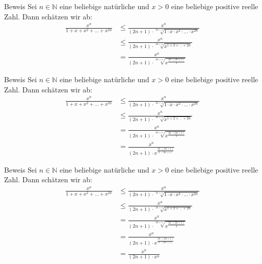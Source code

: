 \documentclass[10pt]{beamer}
\def\bN{\mathbb{N}}
\begin{document}
\begin{frame}{Beweis}
    Sei \( n \in \bN \) eine beliebige natürliche und \( x > 0 \) eine beliebige positive reelle Zahl. Dann schätzen wir ab:
    \begin{align*}
        \frac{x^{n}}{1 + x + x^{2} + \ldots + x^{2n}}
        & \leq \frac{x^{n}}{\left( 2n + 1 \right) \cdot \sqrt[2n + 1]{1 \cdot x \cdot x^{2} \cdot \ldots \cdot x^{2n}}} \\
        & \leq \frac{x^{n}}{\left( 2n + 1 \right) \cdot \sqrt[2n + 1]{x^{1 + 2 + \ldots + 2n}}} \\ 
        & = \frac{x^{n}}{\left( 2n + 1 \right) \cdot \sqrt[2n + 1]{x^{\frac{2n \cdot \left( 2n + 1 \right)}{2}}}}
    \end{align*}
\end{frame}



\begin{frame}{Beweis}
    Sei \( n \in \bN \) eine beliebige natürliche und \( x > 0 \) eine beliebige positive reelle Zahl. Dann schätzen wir ab:
    \begin{align*}
        \frac{x^{n}}{1 + x + x^{2} + \ldots + x^{2n}}
        & \leq \frac{x^{n}}{\left( 2n + 1 \right) \cdot \sqrt[2n + 1]{1 \cdot x \cdot x^{2} \cdot \ldots \cdot x^{2n}}} \\
        & \leq \frac{x^{n}}{\left( 2n + 1 \right) \cdot \sqrt[2n + 1]{x^{1 + 2 + \ldots + 2n}}} \\ 
        & = \frac{x^{n}}{\left( 2n + 1 \right) \cdot \sqrt[2n + 1]{x^{\frac{2n \cdot \left( 2n + 1 \right)}{2}}}} \\
        & = \frac{x^{n}}{\left( 2n + 1 \right) \cdot x^{\frac{2n \cdot \left( 2n + 1 \right)}{2 \cdot \left( 2n + 1 \right)}}}
    \end{align*}
\end{frame}



\begin{frame}{Beweis}
    Sei \( n \in \bN \) eine beliebige natürliche und \( x > 0 \) eine beliebige positive reelle Zahl. Dann schätzen wir ab:
    \begin{align*}
        \frac{x^{n}}{1 + x + x^{2} + \ldots + x^{2n}}
        & \leq \frac{x^{n}}{\left( 2n + 1 \right) \cdot \sqrt[2n + 1]{1 \cdot x \cdot x^{2} \cdot \ldots \cdot x^{2n}}} \\
        & \leq \frac{x^{n}}{\left( 2n + 1 \right) \cdot \sqrt[2n + 1]{x^{1 + 2 + \ldots + 2n}}} \\ 
        & = \frac{x^{n}}{\left( 2n + 1 \right) \cdot \sqrt[2n + 1]{x^{\frac{2n \cdot \left( 2n + 1 \right)}{2}}}} \\
        & = \frac{x^{n}}{\left( 2n + 1 \right) \cdot x^{\frac{2n \cdot \left( 2n + 1 \right)}{2 \cdot \left( 2n + 1 \right)}}} \\
        & = \frac{x^{n}}{\left( 2n + 1 \right) \cdot x^{n}}
    \end{align*}
\end{frame}
\end{document}
